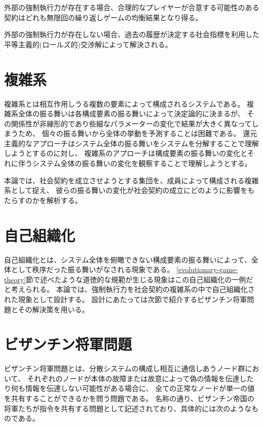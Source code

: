 \begin{description}
  \item 外部の強制執行力が存在する場合、合理的なプレイヤーが合意する可能性のある契約はどれも無限回の繰り返しゲームの均衡結果となり得る。
  \item 外部の強制執行力が存在しない場合、過去の履歴が決定する社会指標を利用した平等主義的(ロールズ的)交渉解によって解決される。 
\end{description}

\section{複雑系}
複雑系とは相互作用しうる複数の要素によって構成されるシステムである。
複雑系全体の振る舞いは各構成要素の振る舞いによって決定論的に決まるが、
その関係性が非線形的であり些細なパラメーターの変化で結果が大きく異なってしまうため、
個々の振る舞いから全体の挙動を予測することは困難である。
還元主義的なアプローチはシステム全体の振る舞いをシステムを分解することで理解しようとするのに対し、
複雑系のアプローチは構成要素の振る舞いの変化とそれに伴うシステム全体の振る舞いの変化を観察することで理解しようとする。

本論では、社会契約を成立させようとする集団を、成員によって構成される複雑系として捉え、
彼らの振る舞いの変化が社会契約の成立にどのように影響をもたらすのかを解析する。

\section{自己組織化}
自己組織化とは、システム全体を俯瞰できない構成要素の振る舞いによって、全体として秩序だった振る舞いがなされる現象である。
\ref{evolutionary-game-theory}節で述べたような道徳的な規範が生じる現象はこの自己組織化の一例だと考えられる。
本論では、強制執行力を社会契約の複雑系の中で自己組織化された現象として設計する。
設計にあたっては次節で紹介するビザンチン将軍問題とその解決策を用いる。

\section{ビザンチン将軍問題}
ビザンチン将軍問題とは、分散システムの構成し相互に通信しあうノード群において、
それぞれのノードが本体の故障または故意によって偽の情報を伝達したり何も情報を伝達しない可能性がある場合に、
全ての正常なノードが単一の値を共有することができるかを問う問題である。\cite{lamport1982}
名称の通り、ビザンチン帝国の将軍たちが指令を共有する問題として記述されており、具体的には次のようなものである。

